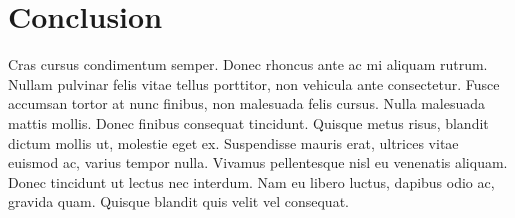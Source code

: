 \section{Conclusion}

Cras cursus condimentum semper. Donec rhoncus ante ac mi aliquam rutrum. Nullam pulvinar felis vitae tellus porttitor, non vehicula ante consectetur. Fusce accumsan tortor at nunc finibus, non malesuada felis cursus. Nulla malesuada mattis mollis. Donec finibus consequat tincidunt. Quisque metus risus, blandit dictum mollis ut, molestie eget ex. Suspendisse mauris erat, ultrices vitae euismod ac, varius tempor nulla. Vivamus pellentesque nisl eu venenatis aliquam. Donec tincidunt ut lectus nec interdum. Nam eu libero luctus, dapibus odio ac, gravida quam. Quisque blandit quis velit vel consequat.